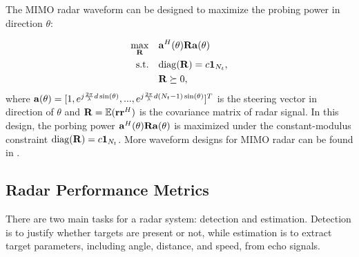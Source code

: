 The MIMO radar waveform can be designed to maximize the probing power in direction $\theta$:

\begin{subequations}
    \begin{align}
      \max_{{\bf R}} \quad & {\bf a}^H(\theta) {\bf R} {\bf a}(\theta) \\
      \mathrm{s.t.} \quad & \mathrm{diag}({\bf R}) = c{\bf 1}_{N_t}, \\ 
      & {\bf R} \succeq 0,
    \end{align}
\end{subequations}
where ${\bf{a}}(\theta) = [1, e^{j\frac{2\pi}{\lambda}d\sin({\theta})},...,e^{j\frac{2\pi}{\lambda}d(N_t-1)\sin({\theta})}]^T$
is the steering vector in direction of $\theta$ and ${\bf R} = \mathbb{E}({\bf{r}}{\bf{r}}^H)$ is the covariance matrix of radar signal.
In this design, the porbing power ${\bf a}^H(\theta) {\bf R} {\bf a}(\theta)$ is maximized under the constant-modulus constraint 
$\mathrm{diag}({\bf R}) = c{\bf 1}_{N_t}$. More waveform designs for MIMO radar can be found in \cite{stoica2007probing}.

\subsection{Radar Performance Metrics} \label{sec:radar_metric}

There are two main tasks for a radar system: detection and estimation. Detection is to justify whether targets are present or not,
while estimation is to extract target parameters, including angle, distance, and speed, from echo signals.

